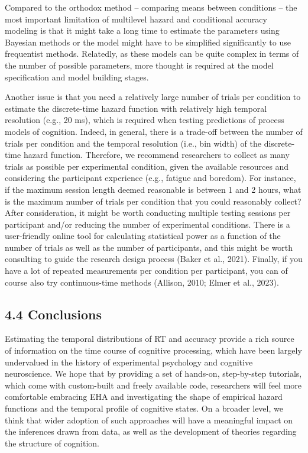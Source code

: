 \documentclass[
  english,
  man, donotrepeattitle,floatsintext]{apa6}
\begin{document}
Compared to the orthodox method -- comparing means between conditions -- the most important limitation of multilevel hazard and conditional accuracy modeling is that it might take a long time to estimate the parameters using Bayesian methods or the model might have to be simplified significantly to use frequentist methods. Relatedly, as these models can be quite complex in terms of the number of possible parameters, more thought is required at the model specification and model building stages.

Another issue is that you need a relatively large number of trials per condition to estimate the discrete-time hazard function with relatively high temporal resolution (e.g., 20 ms), which is required when testing predictions of process models of cognition. Indeed, in general, there is a trade-off between the number of trials per condition and the temporal resolution (i.e., bin width) of the discrete-time hazard function. Therefore, we recommend researchers to collect as many trials as possible per experimental condition, given the available resources and considering the participant experience (e.g., fatigue and boredom). For instance, if the maximum session length deemed reasonable is between 1 and 2 hours, what is the maximum number of trials per condition that you could reasonably collect? After consideration, it might be worth conducting multiple testing sessions per participant and/or reducing the number of experimental conditions. There is a user-friendly online tool for calculating statistical power as a function of the number of trials as well as the number of participants, and this might be worth consulting to guide the research design process (Baker et al., 2021). Finally, if you have a lot of repeated measurements per condition per participant, you can of course also try continuous-time methods (Allison, 2010; Elmer et al., 2023).

\subsection{4.4 Conclusions}\label{conclusions}

Estimating the temporal distributions of RT and accuracy provide a rich source of information on the time course of cognitive processing, which have been largely undervalued in the history of experimental psychology and cognitive neuroscience. We hope that by providing a set of hands-on, step-by-step tutorials, which come with custom-built and freely available code, researchers will feel more comfortable embracing EHA and investigating the shape of empirical hazard functions and the temporal profile of cognitive states. On a broader level, we think that wider adoption of such approaches will have a meaningful impact on the inferences drawn from data, as well as the development of theories regarding the structure of cognition.
\end{document}
